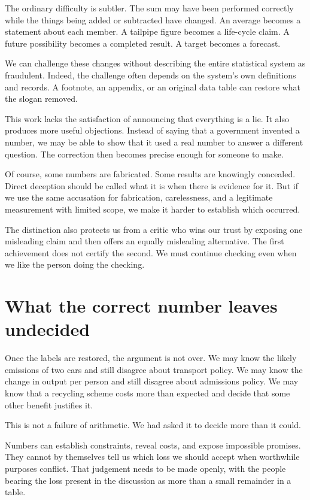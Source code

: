 \documentclass[12pt,a4paper]{book}
\begin{document}
The ordinary difficulty is subtler. The sum may have been performed correctly while the things being added or subtracted have changed. An average becomes a statement about each member. A tailpipe figure becomes a life-cycle claim. A future possibility becomes a completed result. A target becomes a forecast.

We can challenge these changes without describing the entire statistical system as fraudulent. Indeed, the challenge often depends on the system's own definitions and records. A footnote, an appendix, or an original data table can restore what the slogan removed.

This work lacks the satisfaction of announcing that everything is a lie. It also produces more useful objections. Instead of saying that a government invented a number, we may be able to show that it used a real number to answer a different question. The correction then becomes precise enough for someone to make.

Of course, some numbers are fabricated. Some results are knowingly concealed. Direct deception should be called what it is when there is evidence for it. But if we use the same accusation for fabrication, carelessness, and a legitimate measurement with limited scope, we make it harder to establish which occurred.

The distinction also protects us from a critic who wins our trust by exposing one misleading claim and then offers an equally misleading alternative. The first achievement does not certify the second. We must continue checking even when we like the person doing the checking.

\section*{What the correct number leaves undecided}

Once the labels are restored, the argument is not over. We may know the likely emissions of two cars and still disagree about transport policy. We may know the change in output per person and still disagree about admissions policy. We may know that a recycling scheme costs more than expected and decide that some other benefit justifies it.

This is not a failure of arithmetic. We had asked it to decide more than it could.

Numbers can establish constraints, reveal costs, and expose impossible promises. They cannot by themselves tell us which loss we should accept when worthwhile purposes conflict. That judgement needs to be made openly, with the people bearing the loss present in the discussion as more than a small remainder in a table.
\end{document}
